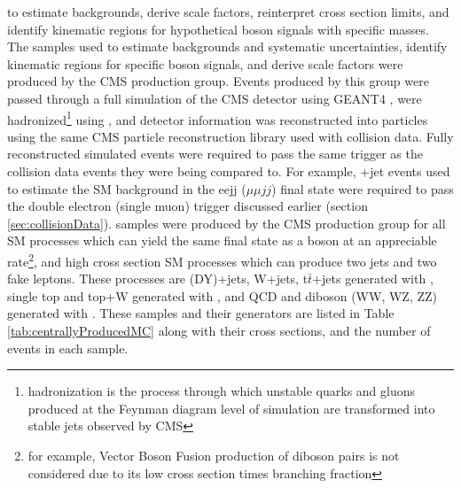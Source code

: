 to estimate backgrounds, derive
scale factors, reinterpret \WR cross section limits, and identify kinematic regions for
hypothetical \WR boson signals with specific \WR masses.  The \MC samples used to estimate backgrounds
and systematic uncertainties, identify kinematic regions for specific \WR boson signals, and derive
scale factors were produced by the CMS \MC production group.  Events produced by this group were
passed through a full simulation of the CMS detector using GEANT4 \cite{geant4}, were hadronized\footnote{hadronization
is the process through which unstable quarks and gluons produced at the Feynman diagram level of simulation
are transformed into stable jets observed by CMS} using \PYTHIA, and detector information was reconstructed
into particles using the same CMS particle reconstruction library used with collision data.
Fully reconstructed simulated events were required to pass the same trigger as the collision
data events they were being compared to.  For example, \DY +jet events used to estimate the SM
background in the eejj ($\mu\mu jj$) final state were required to pass the double electron
(single muon) trigger discussed earlier (section \ref{sec:collisionData}).
\MC samples were produced by the CMS \MC production group for all SM processes which can yield
the same final state as a \WR boson at an appreciable rate\footnote{for example, Vector Boson Fusion production
of diboson pairs is not considered due to its low cross section times branching
fraction}, and high cross section SM processes which can produce two jets
and two fake leptons.  These processes are \DY (DY)+jets, W+jets, t$\bar{t}$+jets generated
with \MADGRAPH \cite{madgraph}, single top and top+W generated with \POWHEG \cite{powheg}, and
QCD and diboson (WW, WZ, ZZ) generated with \PYTHIA \cite{pythia8}\cite{Sjostrand:2006za}.
These samples and their generators are listed in Table \ref{tab:centrallyProducedMC} along
with their cross sections, and the number of events in each sample.


